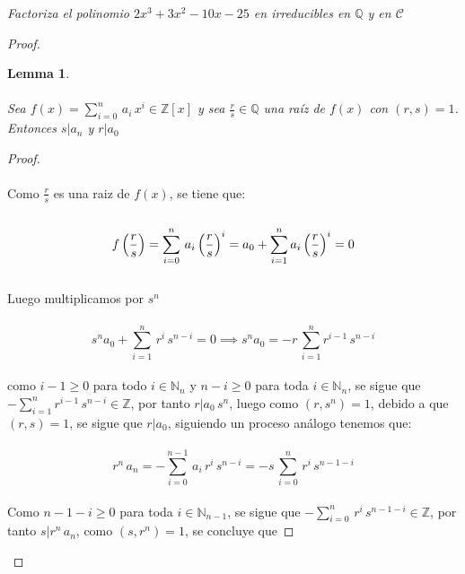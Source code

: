 \documentclass[11pt,letterpaper]{article}
\newtheorem{lemma}[theorem]{Lemma}
\newcommand{\C}{\mathcal{C}}
\newcommand{\N}{\mathbb{N}}
\newcommand{\Z}{\mathbb{Z}}
\newcommand{\Q}{\mathbb{Q}}
\begin{document}
\begin{tcolorbox}[
	title = \textcolor{black}{\textcolor{white}{Problema 8}},]
\textit{Factoriza el polinomio $2x^3+3x^2-10x-25$ en irreducibles en $\Q$ y en $\C$
}
\end{tcolorbox}
\begin{proof}
    \begin{lemma}\,\\
        \,\\
        Sea $f(x)=\sum_{i=0}^n\,a_i\,x^i\in \Z[x]$ y sea $\frac{r}{s}\in \Q$ una ra\'iz de $f(x)$ con $(r,s)=1$. Entonces $s|a_n$ y $r|a_0$
    \end{lemma}
    \begin{proof}\,\\
        \,\\
        Como $\frac{r}{s}$ es una raiz de $f(x)$, se tiene que:\,\\
        \,\\
        \begin{equation*}\,\\
            \,\\
            f\left(\frac{r}{s}\right)=\sum_{i=0}^n\,a_i\left(\frac{r}{s}\right)^i=a_0+\sum_{i=1}^na_i\left(\frac{r}{s}\right)^i=0
        \end{equation*}\,\\
        Luego multiplicamos por $s^n$\,\\
        \,\\
        \begin{equation*}
            s^na_0+\sum_{i=1}^n\,r^i\,s^{n-i}=0\implies s^na_0=-r\,\sum_{i=1}^nr^{i-1}\,s^{n-i}
        \end{equation*}\,\\
        como $i-1\geq 0$ para todo $i\in \N_n$ y $n-i\geq 0$ para toda $i\in \N_n$, se sigue que $-\sum_{i=1}^nr^{i-1}\,s^{n-i}\in \Z$, por tanto
        $r|a_0\,s^n$, luego como $(r,s^n)=1$, debido a que $(r,s)=1$, se sigue que $r|a_0$, siguiendo un proceso an\'alogo tenemos que:\,\\
        \,\\
        \begin{equation*}
            r^n\,a_n=-\sum_{i=0}^{n-1}\,a_i\,r^i\,s^{n-i}=-s\,\sum_{i=0}^n\,r^i\,s^{n-1-i}
        \end{equation*}\,\\
        Como $n-1-i\geq 0$ para toda $i\in \N_{n-1}$, se sigue que $-\sum_{i=0}^n\,r^i\,s^{n-1-i}\in \Z$, por tanto $s|r^n\,a_n$, como $(s,r^n)=1$, se concluye que

\end{proof}
\end{proof}
\end{document}
